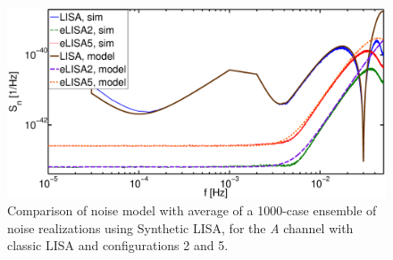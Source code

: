 \documentclass{iopart}
\begin{document}
\begin{figure}
\begin{center}
\includegraphics*[trim = 0mm 0mm 0mm 0mm, clip, scale=.16, angle=0]{FigSean/noiseA.eps}
\caption
{
Comparison of noise model with average of a 1000-case ensemble of noise realizations using {\sc Synthetic LISA},
for the {\emph A} channel with classic LISA and configurations 2 and 5. 
\vspace{10mm}}
\label{fig:noise}
\end{center}
\end{figure}
\end{document}
